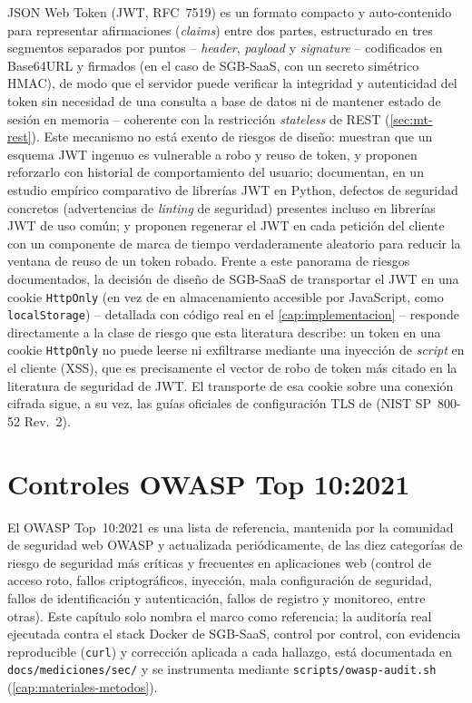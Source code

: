JSON Web Token (JWT, RFC~7519) es un formato compacto y auto-contenido
para representar afirmaciones (\emph{claims}) entre dos partes,
estructurado en tres segmentos separados por puntos -- \emph{header},
\emph{payload} y \emph{signature} -- codificados en Base64URL y firmados
(en el caso de SGB-SaaS, con un secreto simétrico HMAC), de modo que el
servidor puede verificar la integridad y autenticidad del token sin
necesidad de una consulta a base de datos ni de mantener estado de sesión
en memoria -- coherente con la restricción \emph{stateless} de REST
(\autoref{sec:mt-rest}). Este mecanismo no está exento de riesgos de
diseño: \citet{bucko2023jwtbehavior} muestran que un esquema JWT ingenuo
es vulnerable a robo y reuso de token, y proponen reforzarlo con
historial de comportamiento del usuario; \citet{shatnawi2024pythonjwt}
documentan, en un estudio empírico comparativo de librerías JWT en
Python, defectos de seguridad concretos (advertencias de \emph{linting}
de seguridad) presentes incluso en librerías JWT de uso común; y
\citet{ahmed2019jwtscheme} proponen regenerar el JWT en cada petición
del cliente con un componente de marca de tiempo verdaderamente aleatorio
para reducir la ventana de reuso de un token robado. Frente a este
panorama de riesgos documentados, la decisión de diseño de SGB-SaaS de
transportar el JWT en una cookie \texttt{HttpOnly} (en vez de en
almacenamiento accesible por JavaScript, como \texttt{localStorage}) --
detallada con código real en el \autoref{cap:implementacion} -- responde
directamente a la clase de riesgo que esta literatura describe: un
token en una cookie \texttt{HttpOnly} no puede leerse ni exfiltrarse
mediante una inyección de \emph{script} en el cliente (XSS), que es
precisamente el vector de robo de token más citado en la literatura de
seguridad de JWT. El transporte de esa cookie sobre una conexión cifrada
sigue, a su vez, las guías oficiales de configuración TLS de
\citet{mckay2019tls} (NIST SP~800-52 Rev.~2).

\section{Controles OWASP Top 10:2021}
\label{sec:mt-owasp}

El OWASP Top~10:2021 es una lista de referencia, mantenida por la
comunidad de seguridad web OWASP y actualizada periódicamente, de las
diez categorías de riesgo de seguridad más críticas y frecuentes en
aplicaciones web (control de acceso roto, fallos criptográficos,
inyección, mala configuración de seguridad, fallos de identificación y
autenticación, fallos de registro y monitoreo, entre otras). Este
capítulo solo nombra el marco como referencia; la auditoría real
ejecutada contra el stack Docker de SGB-SaaS, control por control, con
evidencia reproducible (\texttt{curl}) y corrección aplicada a cada
hallazgo, está documentada en \texttt{docs/mediciones/sec/} y se
instrumenta mediante \texttt{scripts/owasp-audit.sh}
(\autoref{cap:materiales-metodos}).

